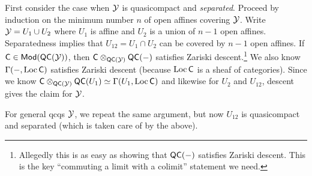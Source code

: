 \documentclass{article}
\begin{document}
First consider the case when $\mathcal{Y}$ is quasicompact and \emph{separated}.
Proceed by induction on the minimum number $n$ of open affines covering $\mathcal{Y}$.
Write $\mathcal{Y} = U_1 \cup U_2$ where $U_1$ is affine and $U_2$ is a union of $n-1$ open affines.
Separatedness implies that $U_{12} = U_1 \cap U_2$ can be covered by $n-1$ open affines.
If $\mathsf{C} \in \mathsf{Mod}(\mathsf{QC}(\mathcal{Y}))$, then $\mathsf{C} \otimes_{\mathsf{QC}(\mathcal{Y})} \mathsf{QC}(-)$ satisfies Zariski descent.\footnote{Allegedly this is as easy as showing that $\mathsf{QC}(-)$ satisfies Zariski descent.
This is the key ``commuting a limit with a colimit'' statement we need.}
We also know $\Gamma(-, \operatorname{Loc} \mathsf{C})$ satisfies Zariski descent (because $\operatorname{Loc} \mathsf{C}$ is a sheaf of categories).
Since we know $\mathsf{C} \otimes_{\mathsf{QC}(\mathcal{Y})} \mathsf{QC}(U_1) \simeq \Gamma(U_1, \operatorname{Loc} \mathsf{C})$ and likewise for $U_2$ and $U_{12}$, descent gives the claim for $\mathcal{Y}$.

For general qcqs $\mathcal{Y}$, we repeat the same argument, but now $U_{12}$ is quasicompact and separated (which is taken care of by the above).
\end{document}
